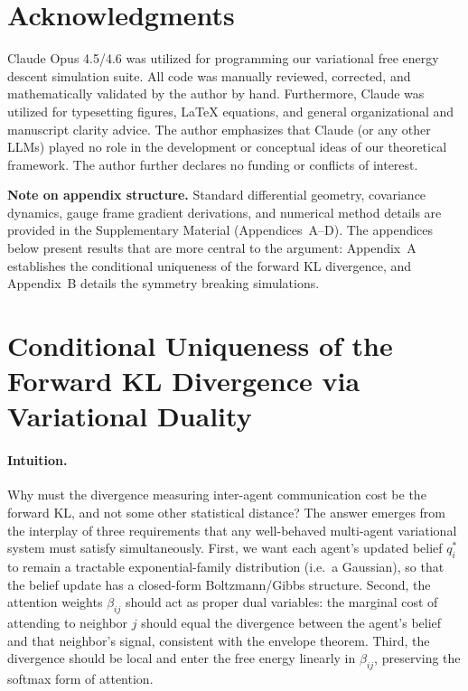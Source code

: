 \documentclass[twoside,11pt]{article}
\begin{document}
\section*{Acknowledgments}
Claude Opus 4.5/4.6 was utilized for programming our variational free energy descent simulation suite.  All code was manually reviewed, corrected, and mathematically validated by the author by hand.  Furthermore, Claude was utilized for typesetting figures, LaTeX equations, and general organizational and manuscript clarity advice.  The author emphasizes that Claude (or any other LLMs) played no role in the development or conceptual ideas of our theoretical framework. The author further declares no funding or conflicts of interest.

\appendix

\textbf{Note on appendix structure.} Standard differential geometry, covariance dynamics, gauge frame gradient derivations, and numerical method details are provided in the Supplementary Material (Appendices~A--D). The appendices below present results that are more central to the argument: Appendix~A establishes the conditional uniqueness of the forward KL divergence, and Appendix~B details the symmetry breaking simulations.

\section{Conditional Uniqueness of the Forward KL Divergence via Variational Duality}

\paragraph{Intuition.}
Why must the divergence measuring inter-agent communication cost be the forward KL, and not some other statistical distance?  The answer emerges from the interplay of three requirements that any well-behaved multi-agent variational system must satisfy simultaneously.  First, we want each agent's updated belief $q_i^*$ to remain a tractable exponential-family distribution (i.e.\ a Gaussian), so that the belief update has a closed-form Boltzmann/Gibbs structure.  Second, the attention weights $\beta_{ij}$ should act as proper dual variables: the marginal cost of attending to neighbor $j$ should equal the divergence between the agent's belief and that neighbor's signal, consistent with the envelope theorem.  Third, the divergence should be local and enter the free energy linearly in $\beta_{ij}$, preserving the softmax form of attention.
\end{document}

